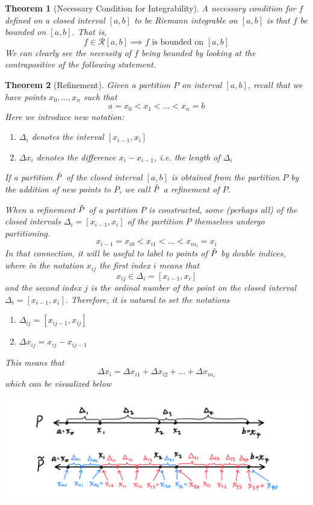 \documentclass{article}
\newtheorem{theorem}{Theorem}[section]
\theoremstyle{remark}
\theoremstyle{definition}
\begin{document}
\begin{theorem}[Necessary Condition for Integrability]
A necessary condition for $f$ defined on a closed interval $[a, b]$ to be Riemann integrable on $[a, b]$ is that $f$ be bounded on $[a, b]$. That is, 
\[f \in \mathcal{R}[a, b] \implies f \text{ is bounded on } [a, b]\]
We can clearly see the necessity of $f$ being bounded by looking at the contrapositive of the following statement. 
\end{theorem}

\begin{theorem}[Refinement]
Given a partition $P$ on interval $[a, b]$, recall that we have points $x_0, \ldots, x_n$ such that
\[a = x_0 < x_1 < \ldots < x_n = b\]
Here we introduce new notation: 
\begin{enumerate}
    \item $\Delta_i$ denotes the interval $[x_{i-1}, x_i]$
    \item $\Delta x_i$ denotes the difference $x_i - x_{i-1}$, i.e. the length of $\Delta_i$
\end{enumerate}
If a partition $\Tilde{P}$ of the closed interval $[a, b]$ is obtained from the partition $P$ by the addition of new points to $P$, we call $\Tilde{P}$ a \textit{refinement} of $P$. 

When a refinement $\Tilde{P}$ of a partition $P$ is constructed, some (perhaps all) of the closed intervals $\Delta_i = [x_{i-1}, x_i]$ of the partition $P$ themselves undergo partitioning. 
\[x_{i-1} = x_{i0} < x_{i1} < \ldots < x_{in_i} = x_i\]
In that connection, it will be useful to label to points of $\Tilde{P}$ by double indices, where in the notation $x_{ij}$ the first index $i$ means that 
\[x_{ij} \in \Delta_i = [x_{i-1}, x_i]\]
and the second index $j$ is the ordinal number of the point on the closed interval $\Delta_i = [x_{i-1}, x_i]$. Therefore, it is natural to set the notations
\begin{enumerate}
    \item $\Delta_{ij} = [x_{i j-1}, x_{ij}]$
    \item $\Delta x_{ij} = x_{ij} - x_{ij-1}$
\end{enumerate}
This means that 
\[\Delta x_i = \Delta x_{i1} + \Delta x_{i2} + \ldots + \Delta x_{in_i}\]
which can be visualized below
\begin{center}
  \includegraphics[scale=0.3]{img/Refinement_Definition_Analysis.PNG}
\end{center}
\end{theorem}
\end{document}

